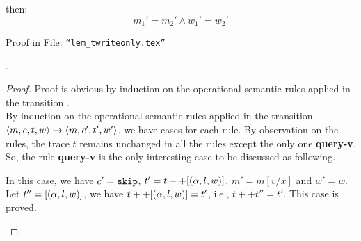 {{{\begin{lem}
%
then:
%
\[
  m_1' = m_2' \land w_1' = w_2'
\]
\end{lem}
%
\begin{subproof}
%
Proof in File: {\tt ``lem\_twriteonly.tex''}
% 
\end{subproof}
}
%
%
%
\begin{lem}
.
\\
\end{lem}
%
\begin{proof}
{
Proof is obvious by induction on the operational semantic rules applied in the transition 
.
\\
By induction on the operational semantic rules applied in the transition $\langle m, c, t, w \rangle 
\rightarrow
\langle m, c', t', w' \rangle$, 
we have cases for each rule.
By observation on the rules, 
the trace $t$ remains unchanged in all the rules except the only one \textbf{query-v}.
So, the rule \textbf{query-v} is the only interesting case to be discussed as following.
\begin{itemize}
\caseL{
\[
  \inferrule
  {
  \query(\qval) = v
  }
  {
  \config{m, [\assign{x}{\query(\qval)}]^l, t, w} \xrightarrow{}  
  \config{m, \eskip, t ++ [(\qval, l, w)], w}
  }
  ~\textbf{query-v}
\]
}
%
In this case, we have $c' = \mathtt{skip}$, 
$t' = t ++ [(\alpha, l, w)]$, $m' = m[v/x]$ and $w' = w$.
\\
Let $t'' = [(\alpha, l, w)]$, we have $t ++ [(\alpha, l, w)] = t'$,
i.e., $t ++ t'' = t'$. This case is proved.
\end{itemize}
}
\end{proof}
%
}
%
}
